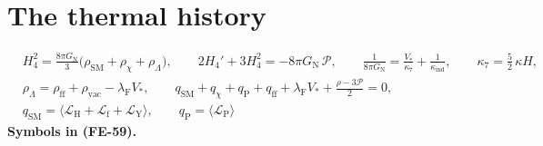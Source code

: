 \documentclass[
  10pt,
]{article}
\begin{document}
\hypertarget{the-thermal-history}{%
\section{The thermal history}\label{the-thermal-history}}

\[
\begin{aligned}
&H_4^2 = \frac{8\pi G_{\mathrm{N}}}{3}\big(\rho_{\mathrm{SM}} + \rho_\chi + \rho_\Lambda\big),\qquad
 2H_4' + 3H_4^2 = -8\pi G_{\mathrm{N}}\,\mathcal{P},\qquad
 \frac{1}{8\pi G_{\mathrm{N}}} = \frac{V_*}{\kappa_7} + \frac{1}{\kappa_{\mathrm{ind}}},\qquad \kappa_7 = \frac52\,\kappa H,\\
&\rho_\Lambda = \rho_{\mathrm{ff}} + \rho_{\mathrm{vac}} - \lambda_{\mathrm{F}}V_*,\qquad
 q_{\mathrm{SM}} + q_\chi + q_{\mathrm{P}} + q_{\mathrm{ff}} + \lambda_{\mathrm{F}}V_* + \frac{\rho - 3\mathcal{P}}{2} = 0,\\
&q_{\mathrm{SM}} = \big\langle\mathcal{L}_{\mathrm{H}} + \mathcal{L}_{\mathrm{f}} + \mathcal{L}_{\mathrm{Y}}\big\rangle,\qquad
 q_{\mathrm{P}} = \langle\mathcal{L}_{\mathrm{P}}\rangle
\end{aligned} \tag{FE-59}
\] \textbf{Symbols in (FE-59).}
\end{document}
